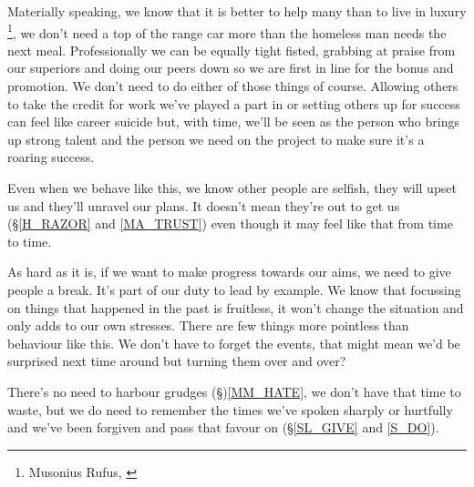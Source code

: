 \cleardoublepage
{\small

Materially speaking, we know that it is better to help many than to live in luxury \footnote{Musonius Rufus, \cite{RLS}}, we don't need a top of the range car more than the homeless man needs the next meal. Professionally we can be equally tight fisted, grabbing at praise from our superiors and doing our peers down so we are first in line for the bonus and promotion. We don't need to do either of those things of course. Allowing others to take the credit for work we've played a part in or setting others up for success can feel like career suicide but, with time, we'll be seen as the person who brings up strong talent and the person we need on the project to make sure it's a roaring success.

Even when we behave like this, we know other people are selfish, they will upset us and they'll unravel our plans. It doesn't mean they're out to get us (\S \ref{H_RAZOR} and \ref{MA_TRUST}) even though it may feel like that from time to time.

As hard as it is, if we want to make progress towards our aims, we need to give people a break. It's part of our duty to lead by example. We know that focussing on things that happened in the past is fruitless, it won't change the situation and only adds to our own stresses. There are few things more pointless than behaviour like this. We don't have to forget the events, that might mean we'd be surprised next time around but turning them over and over?

There's no need to harbour grudges (\S)\ref{MM_HATE}, we don't have that time to waste, but we do need to remember the times we've spoken sharply or hurtfully and we've been forgiven and pass that favour on (\S \ref{SL_GIVE} and \ref{S_DO}). 

}
